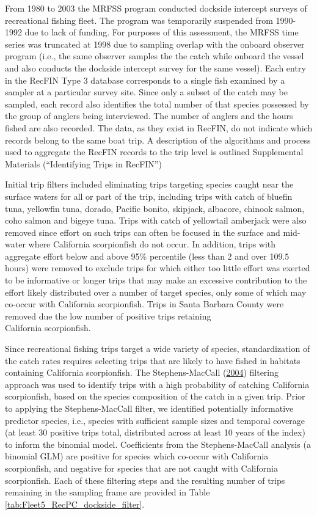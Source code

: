 \documentclass[12pt,]{article}
\begin{document}
From 1980 to 2003 the MRFSS program conducted dockside intercept surveys
of recreational fishing fleet. The program was temporarily suspended
from 1990-1992 due to lack of funding. For purposes of this assessment,
the MRFSS time series was truncated at 1998 due to sampling overlap with
the onboard observer program (i.e., the same observer samples the the
catch while onboard the vessel and also conducts the dockside intercept
survey for the same vessel). Each entry in the RecFIN Type 3 database
corresponds to a single fish examined by a sampler at a particular
survey site. Since only a subset of the catch may be sampled, each
record also identifies the total number of that species possessed by the
group of anglers being interviewed. The number of anglers and the hours
fished are also recorded. The data, as they exist in RecFIN, do not
indicate which records belong to the same boat trip. A description of
the algorithms and process used to aggregate the RecFIN records to the
trip level is outlined Supplemental Materials (``Identifying Trips in
RecFIN'')

Initial trip filters included eliminating trips targeting species caught
near the surface waters for all or part of the trip, including trips
with catch of bluefin tuna, yellowfin tuna, dorado, Pacific bonito,
skipjack, albacore, chinook salmon, coho salmon and bigeye tuna. Trips
with catch of yellowtail amberjack were also removed since effort on
such trips can often be focused in the surface and mid-water where
California scorpionfish do not occur. In addition, trips with aggregate
effort below and above 95\% percentile (less than 2 and over 109.5
hours) were removed to exclude trips for which either too little effort
was exerted to be informative or longer trips that may make an excessive
contribution to the effort likely distributed over a number of target
species, only some of which may co-occur with California scorpionfish.
Trips in Santa Barbara County were removed due the low number of
positive trips retaining\\
California scorpionfish.

Since recreational fishing trips target a wide variety of species,
standardization of the catch rates requires selecting trips that are
likely to have fished in habitats containing California scorpionfish.
The Stephens-MacCall (\protect\hyperlink{ref-Stephens2004}{2004})
filtering approach was used to identify trips with a high probability of
catching California scorpionfish, based on the species composition of
the catch in a given trip. Prior to applying the Stephens-MacCall
filter, we identified potentially informative predictor species, i.e.,
species with sufficient sample sizes and temporal coverage (at least 30
positive trips total, distributed across at least 10 years of the index)
to inform the binomial model. Coefficients from the Stephens-MacCall
analysis (a binomial GLM) are positive for species which co-occur with
California scorpionfish, and negative for species that are not caught
with California scorpionfish. Each of these filtering steps and the
resulting number of trips remaining in the sampling frame are provided
in Table \ref{tab:Fleet5_RecPC_dockside_filter}.
\end{document}
